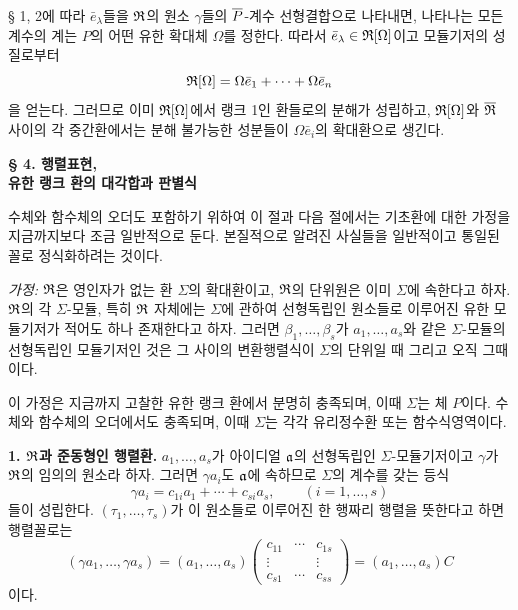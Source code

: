 § 1, 2에 따라 \(\bar e_\lambda\)들을 \(\mathfrak{R}\)의 원소 \(\gamma\)들의 \(\overline P\)-계수 선형결합으로 나타내면, 나타나는 모든 계수의 계는 \(P\)의 어떤 유한 확대체 \(\Omega\)를 정한다. 따라서 \(\bar e_\lambda\in\mathfrak{R}[\Omega]\)이고 모듈기저의 성질로부터
\[
        \mathfrak{R}[\Omega]=\Omega\bar e_1+\cdots+\Omega\bar e_n
\]
을 얻는다. 그러므로 이미 \(\mathfrak{R}[\Omega]\)에서 랭크 1인 환들로의 분해가 성립하고, \(\mathfrak{R}[\Omega]\)와 \(\overline{\mathfrak R}\) 사이의 각 중간환에서는 분해 불가능한 성분들이 \(\Omega\bar e_i\)의 확대환으로 생긴다.

\begin{center}
\textbf{§ 4. 행렬표현,}\\
\textbf{유한 랭크 환의 대각합과 판별식}
\end{center}

수체와 함수체의 오더도 포함하기 위하여 이 절과 다음 절에서는 기초환에 대한 가정을 지금까지보다 조금 일반적으로 둔다. 본질적으로 알려진 사실들을 일반적이고 통일된 꼴로 정식화하려는 것이다.

\emph{가정:} \(\mathfrak{R}\)은 영인자가 없는 환 \(\Sigma\)의 확대환이고, \(\mathfrak{R}\)의 단위원은 이미 \(\Sigma\)에 속한다고 하자. \(\mathfrak{R}\)의 각 \(\Sigma\)-모듈, 특히 \(\mathfrak{R}\) 자체에는 \(\Sigma\)에 관하여 선형독립인 원소들로 이루어진 유한 모듈기저가 적어도 하나 존재한다고 하자. 그러면 \(\beta_1,\ldots,\beta_s\)가 \(a_1,\ldots,a_s\)와 같은 \(\Sigma\)-모듈의 선형독립인 모듈기저인 것은 그 사이의 변환행렬식이 \(\Sigma\)의 단위일 때 그리고 오직 그때이다.

이 가정은 지금까지 고찰한 유한 랭크 환에서 분명히 충족되며, 이때 \(\Sigma\)는 체 \(P\)이다. 수체와 함수체의 오더에서도 충족되며, 이때 \(\Sigma\)는 각각 유리정수환 또는 함수식영역이다.

\textbf{1. \(\mathfrak{R}\)과 준동형인 행렬환.} \(a_1,\ldots,a_s\)가 아이디얼 \(\mathfrak{a}\)의 선형독립인 \(\Sigma\)-모듈기저이고 \(\gamma\)가 \(\mathfrak{R}\)의 임의의 원소라 하자. 그러면 \(\gamma a_i\)도 \(\mathfrak{a}\)에 속하므로 \(\Sigma\)의 계수를 갖는 등식
\[
\gamma a_i=c_{1i}a_1+\cdots+c_{si}a_s,
\qquad (i=1,\ldots,s)
\]
들이 성립한다. \((\tau_1,\ldots,\tau_s)\)가 이 원소들로 이루어진 한 행짜리 행렬을 뜻한다고 하면 행렬꼴로는
\[
(\gamma a_1,\ldots,\gamma a_s)
=(a_1,\ldots,a_s)
\begin{pmatrix}
 c_{11}&\cdots&c_{1s}\\
 \vdots&&\vdots\\
 c_{s1}&\cdots&c_{ss}
\end{pmatrix}
=(a_1,\ldots,a_s)C
\]
이다.

